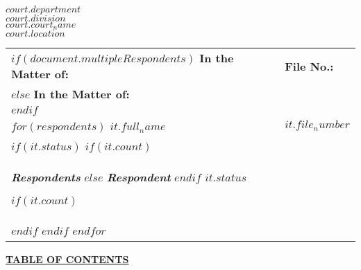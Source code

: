 \documentclass[12pt]{letter}
\begin{document}
\begin{letter}{}

\begin{center}
    \textbf{$court.department$} \\
    \textbf{$court.division$} \\
    \textbf{$court.court_name$} \\
    \textbf{$court.location$}
\end{center}

\renewcommand{\arraystretch}{1.2}  %

\vspace{2em}
\makebox[0.5\textwidth]{\hrulefill}
\begin{flushleft}
    \begin{tabular}{ p{} | p{} }
      
      $if(document.multipleRespondents)$
        \textbf{In the Matter of:} & \textbf{\hspace{1em}File No.:} \\
      $else$
        \textbf{In the Matter of:} \\
      $endif$ 

      \vspace{.0em} & \\ 

      $for(respondents)$
        \textbf{$it.full_name$} & \textbf{\hspace{1em}$it.file_number$} \\
        $if(it.status)$ 
          $if(it.count)$ 
            \vspace{.0em} & \\ 
            \textit{\textbf{Respondents}}
          $else$
            \textit{\textbf{Respondent}} 
          $endif$ 
          \textbf{$it.status$}

          $if(it.count)$ 
            \vspace{.25em} & \\
          $endif$
        $endif$    
      $endfor$

    \end{tabular}
\end{flushleft}
\makebox[0.5\textwidth]{\hrulefill}
 
\vspace{1em}

\fontsize{20}{22}\selectfont %

\begin{center}
    \underline{\textbf{TABLE OF CONTENTS}}
\end{center}


\end{letter}
\end{document}
